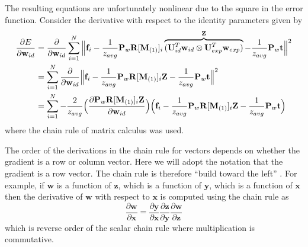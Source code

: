 \documentclass[11pt,a4paper,twoside]{report}
\begin{document}
The resulting equations are unfortunately nonlinear due to the square in the error
function. Consider the derivative with respect to the identity parameters given by 
\begin{align*}\label{eq:fit12}
\frac{\partial E}{\partial \mathbf{w}_{id}} &= \frac{\partial}{\partial \mathbf{w}_{id}}\sum_{i=1}^N \Big\Vert\mathbf{f}_i - \frac{1}{z_{avg}}\mathbf{P}_w\mathbf{R}[\mathbf{M}_{(1)}]_{i}\overbrace{(\mathbf{U}_{id}^T\mathbf{w}_{id} \otimes
\mathbf{U}_{exp}^T\mathbf{w}_{exp})}^{\mathbf{Z}} - \frac{1}{z_{avg}}\mathbf{P}_w\mathbf{t}\Big\Vert^2\\
&=\sum_{i=1}^N \frac{\partial}{\partial \mathbf{w}_{id}}\Big\Vert\mathbf{f}_i - \frac{1}{z_{avg}}\mathbf{P}_w\mathbf{R}[\mathbf{M}_{(1)}]_{i}\mathbf{Z} -
\frac{1}{z_{avg}}\mathbf{P}_w\mathbf{t}\Big\Vert^2\\
&=\sum_{i=1}^N -\frac{2}{z_{avg}}\Bigl(\frac{\partial \mathbf{P}_w\mathbf{R}[\mathbf{M}_{(1)}]_{i}\mathbf{Z}}{\partial
  \mathbf{w}_{id}}\Bigr)\Bigl(\mathbf{f}_i -
\frac{1}{z_{avg}}\mathbf{P}_w\mathbf{R}[\mathbf{M}_{(1)}]_{i}\mathbf{Z} -
\frac{1}{z_{avg}}\mathbf{P}_w\mathbf{t}\Bigr)
\end{align*}
where the chain rule of matrix calculus was used. 

The order of the derivations in the chain rule for vectors depends on whether the gradient is a row or column
vector. Here we will adopt the notation that the gradient is a row vector. The
chain rule is therefore ``build toward the left'' \cite{ifemcolorado}. For example, if $\mathbf{w}$
is a function of $\mathbf{z}$, which is a function of $\mathbf{y}$, which is a
function of $\mathbf{x}$ then the derivative of $\mathbf{w}$ with respect to
$\mathbf{x}$ is computed using the chain rule as
\begin{equation*}
\frac{\partial \mathbf{w}}{\partial \mathbf{x}} = \frac{\partial
  \mathbf{y}}{\partial \mathbf{x}}\frac{\partial \mathbf{z}}{\partial
  \mathbf{y}}\frac{\partial \mathbf{w}}{\partial \mathbf{z}} 
\end{equation*}
which is reverse order of the scalar chain rule where multiplication is
commutative.
\end{document}
